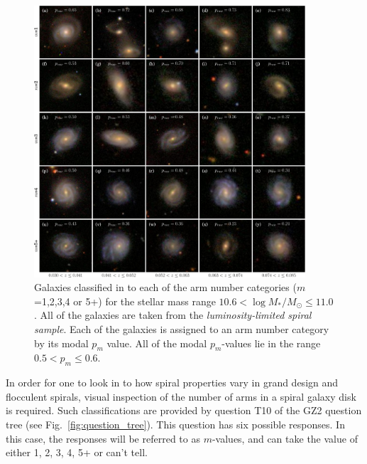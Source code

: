\documentclass[useAMS,usenatbib]{mn2e}
\begin{document}
\begin{figure}
		\centering

        \includegraphics[width=0.9\textwidth]{Images/Results/image_page_p0506_m106110.pdf}

        \caption{Galaxies classified in to each of the arm number categories ($m$=1,2,3,4 or 5+) for the stellar mass range $10.6 < \log{M_*/M_{\odot}} \leq 11.0$. All of the galaxies are taken from the \textit{luminosity-limited spiral sample}. Each of the galaxies is assigned to an arm number category by its modal $p_m$ value. All of the modal $p_m$-values lie in the range $0.5 < p_m \leq 0.6$.}

        \label{fig:image_panel}

\end{figure}

In order for one to look in to how spiral properties vary in grand design and flocculent spirals, visual inspection of the number of arms in a spiral galaxy disk is required. Such classifications are provided by question T10 of the GZ2 question tree (see Fig.~\ref{fig:question_tree}). This question has six possible responses. In this case, the responses will be referred to as $m$-values, and can take the value of either 1, 2, 3, 4, 5+ or can't tell.
\end{document}
